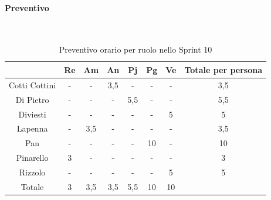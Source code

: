 \documentclass{article}
\begin{document}
                \paragraph{Preventivo}\mbox{}\\
                \begin{table}[H]
                    \centering
                    \begin{tabular}{|c|c|c|c|c|c|c|c|}
                    \hline
                                  & Re  & Am  & An  & Pj  & Pg  & Ve  & Totale per persona \\ \hline
                    Cotti Cottini & -   & -   & 3,5 & -   & -   & -   & 3,5                \\ \hline
                    Di Pietro     & -   & -   & -   & 5,5 & -   & -   & 5,5                \\ \hline
                    Diviesti      & -   & -   & -   & -   & -   & 5   & 5                  \\ \hline
                    Lapenna       & -   & 3,5 & -   & -   & -   & -   & 3,5                \\ \hline
                    Pan           & -   & -   & -   & -   & 10  & -   & 10                 \\ \hline
                    Pinarello     & 3   & -   & -   & -   & -   & -   & 3                  \\ \hline
                    Rizzolo       & -   & -   & -   & -   & -   & 5   & 5                  \\ \hline
                    Totale        & 3   & 3,5 & 3,5 & 5,5 & 10  & 10  &                    \\ \hline
                    \end{tabular}
                    \caption{Preventivo orario per ruolo nello Sprint 10}
                \end{table}

\end{document}
